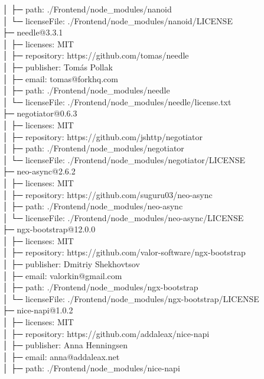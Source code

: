 │  ├─ path: ./Frontend/node\_modules/nanoid\\
│  └─ licenseFile: ./Frontend/node\_modules/nanoid/LICENSE\\
├─ needle@3.3.1\\
│  ├─ licenses: MIT\\
│  ├─ repository: https://github.com/tomas/needle\\
│  ├─ publisher: Tomás Pollak\\
│  ├─ email: tomas@forkhq.com\\
│  ├─ path: ./Frontend/node\_modules/needle\\
│  └─ licenseFile: ./Frontend/node\_modules/needle/license.txt\\
├─ negotiator@0.6.3\\
│  ├─ licenses: MIT\\
│  ├─ repository: https://github.com/jshttp/negotiator\\
│  ├─ path: ./Frontend/node\_modules/negotiator\\
│  └─ licenseFile: ./Frontend/node\_modules/negotiator/LICENSE\\
├─ neo-async@2.6.2\\
│  ├─ licenses: MIT\\
│  ├─ repository: https://github.com/suguru03/neo-async\\
│  ├─ path: ./Frontend/node\_modules/neo-async\\
│  └─ licenseFile: ./Frontend/node\_modules/neo-async/LICENSE\\
├─ ngx-bootstrap@12.0.0\\
│  ├─ licenses: MIT\\
│  ├─ repository: https://github.com/valor-software/ngx-bootstrap\\
│  ├─ publisher: Dmitriy Shekhovtsov\\
│  ├─ email: valorkin@gmail.com\\
│  ├─ path: ./Frontend/node\_modules/ngx-bootstrap\\
│  └─ licenseFile: ./Frontend/node\_modules/ngx-bootstrap/LICENSE\\
├─ nice-napi@1.0.2\\
│  ├─ licenses: MIT\\
│  ├─ repository: https://github.com/addaleax/nice-napi\\
│  ├─ publisher: Anna Henningsen\\
│  ├─ email: anna@addaleax.net\\
│  ├─ path: ./Frontend/node\_modules/nice-napi\\
